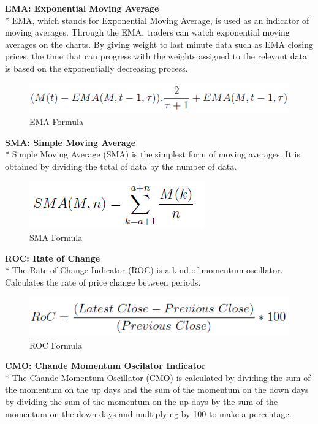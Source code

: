 \documentclass{article}
\begin{document}
\noindent
\textbf{EMA: Exponential Moving Average} \\*
EMA, which stands for Exponential Moving Average, is used as an indicator of moving averages. Through the EMA, traders can watch exponential moving averages on the charts. By giving weight to last minute data such as EMA closing prices, the time that can progress with the weights assigned to the relevant data is based on the exponentially decreasing process.
\begin{figure}[H]
\begin{center}
   \includegraphics[scale=0.8]{Assets/ema.png}
   \caption{EMA Formula}
\end{center}
\end{figure}
\noindent
\textbf{SMA: Simple Moving Average} \\*
Simple Moving Average (SMA) is the simplest form of moving averages. It is obtained by dividing the total of data by the number of data.
\begin{figure}[H]
\begin{center}
   \includegraphics[scale=0.8]{Assets/sma.png}
   \caption{SMA Formula}
\end{center}
\end{figure}
\noindent
\textbf{ROC: Rate of Change}\\*
The Rate of Change Indicator (ROC) is a kind of momentum oscillator. Calculates the rate of price change between periods.
\begin{figure}[H]
\begin{center}
   \includegraphics[scale=0.7]{Assets/roc.png}
   \caption{ROC Formula}
\end{center}
\end{figure}
\noindent
\textbf{CMO: Chande Momentum Oscilator Indicator} \\*
The Chande Momentum Oscillator (CMO) is calculated by dividing the sum of the momentum on the up days and the sum of the momentum on the down days by dividing the sum of the momentum on the up days by the sum of the momentum on the down days and multiplying by 100 to make a percentage.
\end{document}
